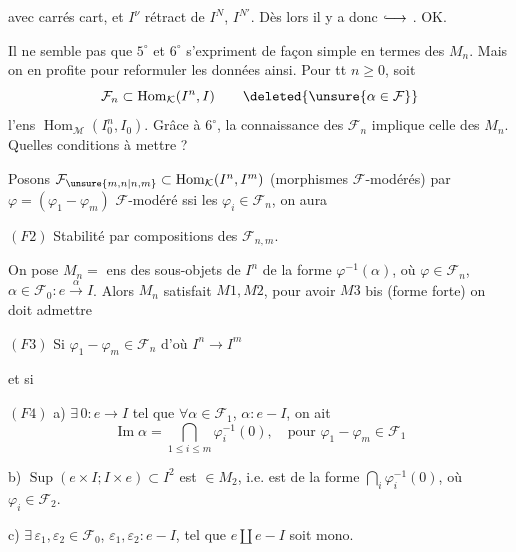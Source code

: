 avec carrés cart, et $I^\nu$ rétract de $I^N$, $I^{N'}$. Dès lors il y a
donc $\lhook\joinrel\longrightarrow$ . OK.


Il ne semble pas que $5^\circ$ et $6^\circ$ s'expriment de façon simple en termes des $M_n$. Mais on en profite pour reformuler les données ainsi. Pour tt $n\geq0$, soit
\[
\mathcal F_n\subset\operatorname{Hom}_{\mathcal K}(I^n,I)\qquad\deleted{\unsure{\alpha\in\mathcal F}}
\]
l'ens $\operatorname{Hom}_{\mathcal M}(I_0^n,I_0)$. Grâce à $6^\circ$, la connaissance des $\mathcal F_n$ implique celle des $M_n$. Quelles conditions à mettre ?

 Posons $\mathcal F_{\unsure{m,n|n,m}}\subset\operatorname{Hom}_{\mathcal K}(I^n,I^m)$  (morphismes $\mathcal F$-modérés) par $\varphi=(\varphi_1-\varphi_m)$ $\mathcal F$-modéré ssi les $\varphi_i\in\mathcal F_n$, on  aura


 $(F2)$ Stabilité par compositions des $\mathcal F_{n,m}$.

On pose $M_n=$ ens des sous-objets de $I^n$  de la forme $\varphi^{-1}(\alpha)$, où $\varphi\in\mathcal F_n$, $\alpha\in\mathcal F_0:e\xrightarrow{\alpha}I$.
Alors $M_n$ satisfait $M1,M2$, pour avoir $M3$ bis (forme forte) on doit admettre

$(F3)$ Si $\varphi_1-\varphi_m\in\mathcal F_n$ d'où $I^n\longrightarrow I^m$

et si \unsure{---}

$(F4)$ a) $\exists\,0:e\longrightarrow I$  tel que $\forall\alpha\in\mathcal F_1$, $\alpha:e-I$, on ait
\[
\operatorname{Im}\alpha=\bigcap_{1\leq i\leq m}\varphi_i^{-1}(0),\quad
\text{pour }\varphi_1-\varphi_m\in\mathcal F_1
\]

b) $\operatorname{Sup}(e\times I;I\times e)\subset I^2$ est $\in M_2$, i.e. est de la forme $\bigcap_i\varphi_i^{-1}(0)$, où $\varphi_i\in\mathcal F_2$.

c) $\exists\,\varepsilon_1,\varepsilon_2\in\mathcal F_0$, $\varepsilon_1,\varepsilon_2:e-I$, tel que $e\amalg e-I$ soit mono.

